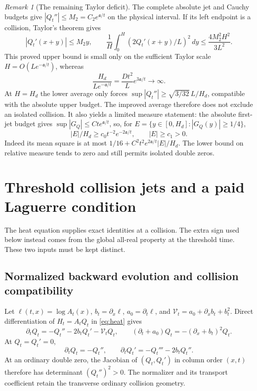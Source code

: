 \documentclass[11pt]{article}
\numberwithin{equation}{section}
\theoremstyle{definition}
\theoremstyle{remark}
\newtheorem{remark}[theorem]{Remark}
\newcommand{\dd}{\,d}
\begin{document}
\begin{remark}[The remaining Taylor deficit]\label{lj:taylor}
The complete absolute jet and Cauchy budgets give
\(|Q_t''|\le M_2=C_2e^{\mathfrak a/t}\) on the physical interval.
If its left endpoint is a collision, Taylor's theorem gives
\[
 |Q_t'(x+y)|\le M_2y,\qquad
 \frac1H\int_0^H(2Q_t'(x+y)/L)^2\dd y
                         \le\frac{4M_2^2H^2}{3L^2}.
\]
This proved upper bound is small only on the sufficient Taylor scale
\(H=O(Le^{-\mathfrak a/t})\), whereas
\[
 \frac{H_d}{Le^{-\mathfrak a/t}}
               =\frac{Dt^2}{L}e^{3\mathfrak a/t}\longrightarrow\infty.
\]
At \(H=H_d\) the lower average only forces
\(\sup|Q_t''|\ge\sqrt{3/32}\,L/H_d\), compatible with the
absolute upper budget. The improved average therefore does not exclude
an isolated collision.
It also yields a limited measure statement: the absolute first-jet
budget gives \(\sup|G_Q|\le Ct e^{\mathfrak a/t}\), so, for
\(E=\{y\in[0,H_d]:|G_Q(y)|\ge1/4\}\),
\[
 |E|/H_d\ge c_0t^{-2}e^{-2\mathfrak a/t},\qquad |E|\ge c_1>0.
\]
Indeed its mean square is at most
\(1/16+C^2t^2e^{2\mathfrak a/t}|E|/H_d\).
The lower bound on relative measure tends to zero and still permits
isolated double zeros.
\end{remark}

\section{Threshold collision jets and a paid Laguerre condition}
\label{lj:threshold}

The heat equation supplies exact identities at a collision. The extra
sign used below instead comes from the global all-real property at the
threshold time. These two inputs must be kept distinct.

\subsection{Normalized backward evolution and collision compatibility}

Let \(\ell(t,x)=\log A_t(x)\),
\(b_t=\partial_x\ell\), \(a_0=\partial_t\ell\), and
\(\mathcal V_t=a_0+\partial_xb_t+b_t^2\). Direct differentiation of
\(H_t=A_tQ_t\) in \eqref{eq:heat} gives
\begin{equation}\label{lj:normalizedpde}
 \partial_tQ_t=-Q_t''-2b_tQ_t'-\mathcal V_tQ_t,\qquad
 (\partial_t+a_0)Q_t=-(\partial_x+b_t)^2Q_t.
\end{equation}
At \(Q_t=Q_t'=0\),
\begin{equation}\label{lj:collisionpde}
 \partial_tQ_t=-Q_t'',\qquad
 \partial_tQ_t'=-Q_t'''-2b_tQ_t''.
\end{equation}
At an ordinary double zero, the Jacobian of \((Q_t,Q_t')\) in
column order \((x,t)\) therefore has determinant \((Q_t'')^2>0\).
The normalizer and its transport coefficient retain the transverse
ordinary collision geometry.
\end{document}
